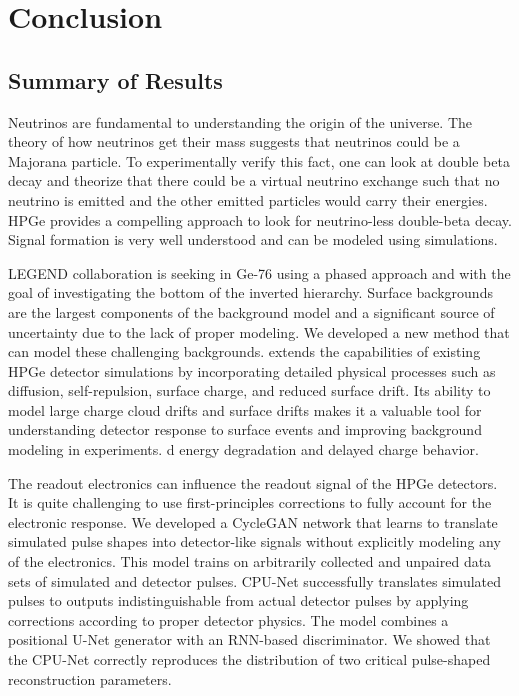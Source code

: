 \chapter{Conclusion}
\section{Summary of Results}
Neutrinos are fundamental to understanding the origin of the universe. The theory of how neutrinos get their mass suggests that neutrinos could be a Majorana particle. To experimentally verify this fact, one can look at double beta decay and theorize that there could be a virtual neutrino exchange such that no neutrino is emitted and the other emitted particles would carry their energies. HPGe provides a compelling approach to look for neutrino-less double-beta decay. Signal formation is very well understood and can be modeled using simulations.

LEGEND collaboration is seeking {\onbb} in Ge-76 using a phased approach and with the goal of investigating the bottom of the inverted hierarchy. Surface backgrounds are the largest components of the background model and a significant source of uncertainty due to the lack of proper modeling. We developed a new method that can model these challenging backgrounds. {\ehd} extends the capabilities of existing HPGe detector simulations by incorporating detailed physical processes such as diffusion, self-repulsion, surface charge, and reduced surface drift. Its ability to model large charge cloud drifts and surface drifts makes it a valuable tool for understanding detector response to surface events and improving background modeling in experiments. d energy degradation and delayed charge behavior.

The readout electronics can influence the readout signal of the HPGe detectors. It is quite challenging to use first-principles corrections to fully account for the electronic response. We developed a CycleGAN network that learns to translate simulated pulse shapes into detector-like signals without explicitly modeling any of the electronics. This model trains on arbitrarily collected and unpaired data sets of simulated and detector pulses. CPU-Net successfully translates simulated pulses to outputs indistinguishable from actual detector pulses by applying corrections according to proper detector physics. The model combines a positional U-Net generator with an RNN-based discriminator. We showed that the CPU-Net correctly reproduces the distribution of two critical pulse-shaped reconstruction parameters.

